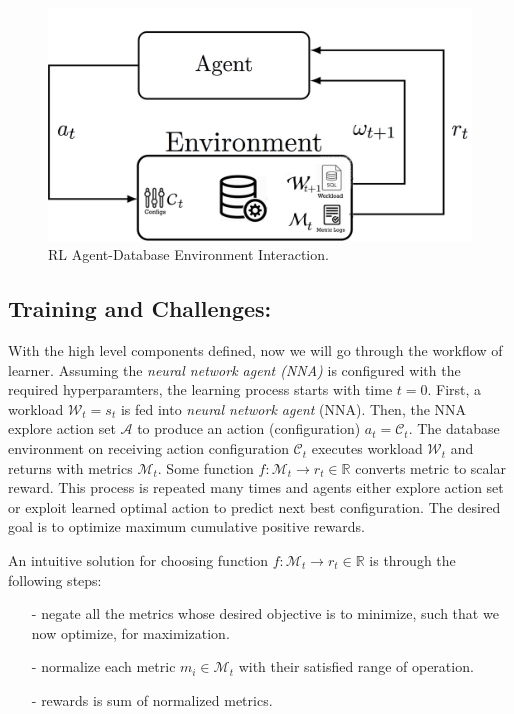 \begin{figure}[h]
  \vspace{-3mm}
	\includegraphics[width=\linewidth ]{fig/database_agent.png}
    \vspace{-5mm}
    \caption{RL Agent-Database Environment Interaction.}
    \label{fig:database_agent}
    \vspace{-5mm}
\end{figure}


\subsection*{Training and Challenges:}
With the high level components defined, now we will go through the workflow of learner.
Assuming the {\em neural network agent (NNA) } is configured with the required hyperparamters, the learning process starts with time $t=0$.
First, a workload $\mathcal{W}_t = s_t$  is fed into {\em neural network agent} (NNA). Then, the NNA explore action set $\mathcal{A}$ to produce an action (configuration) $a_t = \mathcal{C}_t$. The database environment on receiving action configuration $\mathcal{C}_t$ executes workload $\mathcal{W}_t$ and returns with metrics $\mathcal{M}_t$. Some function $f: \mathcal{M}_t \rightarrow r_t \in \mathbb{R}$ converts metric to scalar reward. This process is repeated many times and agents either explore action set or exploit learned optimal action to predict next best configuration. The desired goal is to optimize maximum cumulative positive rewards.

An intuitive solution for choosing function $f: \mathcal{M}_t \rightarrow r_t \in \mathbb{R}$ is  through the following steps:\\
\vspace{-4mm}
\begin{itemize}
  \item[-] negate all the metrics whose desired objective is to minimize, such that we now optimize, for maximization.
  \item[-] normalize each metric $m_i \in \mathcal{M}_t$ with their satisfied range of operation.
  \item[-] rewards is sum  of normalized metrics.
\end{itemize}

